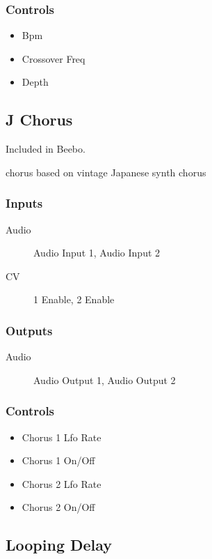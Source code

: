 \subsubsection{Controls}
\begin{itemize}
\item Bpm
\item Crossover Freq
\item Depth
\end{itemize}

\subsection{J Chorus}

Included in Beebo.

chorus based on vintage Japanese synth chorus



\subsubsection{Inputs}
\begin{description}
\item [Audio] Audio Input 1, Audio Input 2
\item [CV] 1 Enable, 2 Enable
\end{description}

\subsubsection{Outputs}
\begin{description}
\item [Audio] Audio Output 1, Audio Output 2
\end{description}

\subsubsection{Controls}
\begin{itemize}
\item Chorus 1 Lfo Rate
\item Chorus 1 On/Off
\item Chorus 2 Lfo Rate
\item Chorus 2 On/Off
\end{itemize}

\subsection{Looping Delay}

